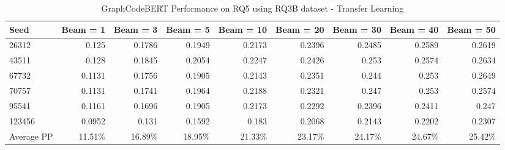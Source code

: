 \begin{table}[H]
\centering
  \caption{GraphCodeBERT Performance on RQ5 using RQ3B dataset - Transfer Learning}
  \label{Appendices:RQ5-finetrain-GraphCodeBERT}
  \begin{tabular}{|l|r|r|r|r|r|r|r|r|}
    \hline
    Seed          & Beam = 1            & Beam = 3          & Beam = 5          &  Beam = 10        & Beam = 20         & Beam = 30         & Beam = 40                & Beam = 50\\
    \hline
    26312          & 0.125              & 0.1786            & 0.1949            & 0.2173            & 0.2396            & 0.2485            & 0.2589                   & 0.2619 \\
    \hline
    43511          & 0.128              & 0.1845            & 0.2054            & 0.2247            & 0.2426            & 0.253             & 0.2574                   & 0.2634 \\
    \hline
    67732          & 0.1131             & 0.1756            & 0.1905            & 0.2143            & 0.2351            & 0.244             & 0.253                    & 0.2649 \\
    \hline
    70757          & 0.1131             & 0.1741            & 0.1964            & 0.2188            & 0.2321            & 0.247             & 0.253                    & 0.2574 \\
    \hline
    95541          & 0.1161             & 0.1696            & 0.1905            & 0.2173            & 0.2292            & 0.2396            & 0.2411                   & 0.247  \\
    \hline
    123456         & 0.0952             & 0.131             & 0.1592            & 0.183             & 0.2068            & 0.2143            & 0.2202                   & 0.2307 \\
    \hline
    Average PP     & 11.51\%            & 16.89\%           & 18.95\%           & 21.33\%          & 23.17\%            & 24.17\%           & 24.67\%                  & 25.42\% \\
    \hline
  \end{tabular}
\end{table}
%
%
%
